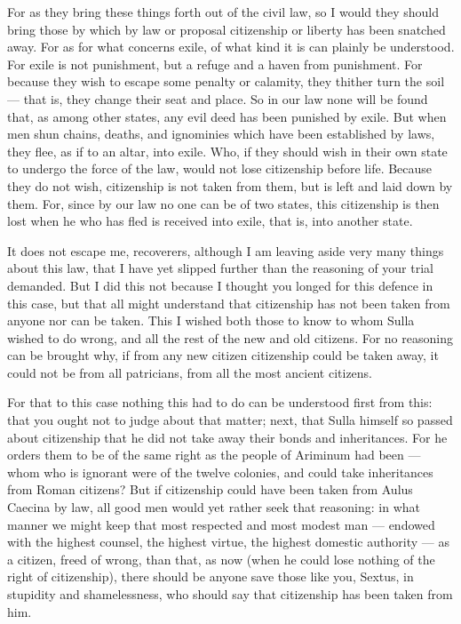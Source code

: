  For as they bring these things forth out of the civil law, so I would they should bring those by which by law or proposal citizenship or liberty has been snatched away. For as for what concerns exile, of what kind it is can plainly be understood. For exile is not punishment, but a refuge and a haven from punishment. For because they wish to escape some penalty or calamity, they thither turn the soil --- that is, they change their seat and place. So in our law none will be found that, as among other states, any evil deed has been punished by exile. But when men shun chains, deaths, and ignominies which have been established by laws, they flee, as if to an altar, into exile. Who, if they should wish in their own state to undergo the force of the law, would not lose citizenship before life. Because they do not wish, citizenship is not taken from them, but is left and laid down by them. For, since by our law no one can be of two states, this citizenship is then lost when he who has fled is received into exile, that is, into another state.

 It does not escape me, recoverers, although I am leaving aside very many things about this law, that I have yet slipped further than the reasoning of your trial demanded. But I did this not because I thought you longed for this defence in this case, but that all might understand that citizenship has not been taken from anyone nor can be taken. This I wished both those to know to whom Sulla wished to do wrong, and all the rest of the new and old citizens. For no reasoning can be brought why, if from any new citizen citizenship could be taken away, it could not be from all patricians, from all the most ancient citizens.

 For that to this case nothing this had to do can be understood first from this: that you ought not to judge about that matter; next, that Sulla himself so passed about citizenship that he did not take away their bonds and inheritances. For he orders them to be of the same right as the people of Ariminum had been --- whom who is ignorant were of the twelve colonies, and could take inheritances from Roman citizens? But if citizenship could have been taken from Aulus Caecina by law, all good men would yet rather seek that reasoning: in what manner we might keep that most respected and most modest man --- endowed with the highest counsel, the highest virtue, the highest domestic authority --- as a citizen, freed of wrong, than that, as now (when he could lose nothing of the right of citizenship), there should be anyone save those like you, Sextus, in stupidity and shamelessness, who should say that citizenship has been taken from him.

